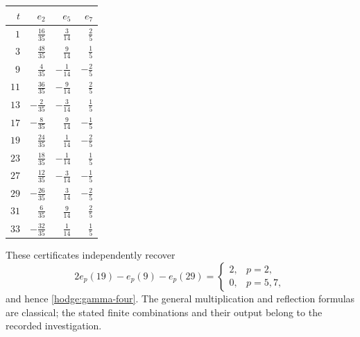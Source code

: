 \documentclass[11pt]{article}
\begin{document}
\begin{longtable}{rrrr}
\toprule
$t$ & $e_2$ & $e_5$ & $e_7$\\
\midrule
\endhead
$1$ & $\frac{16}{35}$ & $\frac{3}{14}$ & $\frac{2}{5}$\\
$3$ & $\frac{48}{35}$ & $\frac{9}{14}$ & $\frac{1}{5}$\\
$9$ & $\frac{4}{35}$ & $-\frac{1}{14}$ & $-\frac{2}{5}$\\
$11$ & $\frac{36}{35}$ & $-\frac{9}{14}$ & $\frac{2}{5}$\\
$13$ & $-\frac{2}{35}$ & $-\frac{3}{14}$ & $\frac{1}{5}$\\
$17$ & $-\frac{8}{35}$ & $\frac{9}{14}$ & $-\frac{1}{5}$\\
$19$ & $\frac{24}{35}$ & $\frac{1}{14}$ & $-\frac{2}{5}$\\
$23$ & $\frac{18}{35}$ & $-\frac{1}{14}$ & $\frac{1}{5}$\\
$27$ & $\frac{12}{35}$ & $-\frac{3}{14}$ & $-\frac{1}{5}$\\
$29$ & $-\frac{26}{35}$ & $\frac{3}{14}$ & $-\frac{2}{5}$\\
$31$ & $\frac{6}{35}$ & $\frac{9}{14}$ & $\frac{2}{5}$\\
$33$ & $-\frac{32}{35}$ & $\frac{1}{14}$ & $\frac{1}{5}$\\
\bottomrule
\end{longtable}

These certificates independently recover
\[
 2e_p(19)-e_p(9)-e_p(29)
 =\begin{cases}2,&p=2,\\0,&p=5,7,\end{cases}
\]
and hence \eqref{hodge:gamma-four}. The general multiplication and reflection
formulas are classical; the stated finite combinations and their output
belong to the recorded investigation.
\end{document}

